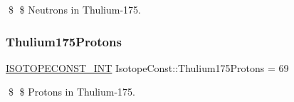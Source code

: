 \$ \$ Neutrons in Thulium-\/175. \mbox{\label{group___isotope_const-_thulium-_tm175_ga69bc84b584c027cf94a0f805601e3f6a}} 
\subsubsection{\texorpdfstring{Thulium175\+Protons}{Thulium175Protons}}
{\footnotesize\ttfamily \mbox{\hyperlink{group___isotope_const-_macros_ga5f18360b3e99483a35c32d789e62621c}{I\+S\+O\+T\+O\+P\+E\+C\+O\+N\+S\+T\+\_\+\+I\+NT}} Isotope\+Const\+::\+Thulium175\+Protons = 69}

\$ \$ Protons in Thulium-\/175. 